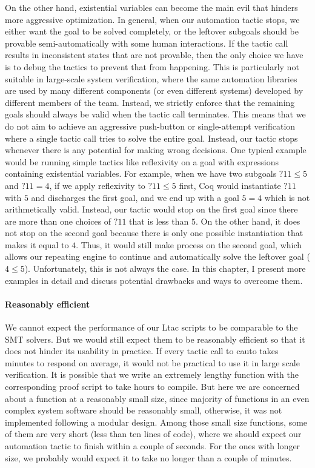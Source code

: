 On the other hand, existential variables can become the main evil that hinders
more aggressive optimization. In general, when our automation tactic stops,
we either want the goal to be solved completely, or the leftover subgoals
should be provable semi-automatically with some human interactions.
If the tactic call results in inconsistent states that are not provable,
then the only choice we have is to debug the tactics to prevent that from
happening. This is particularly not suitable in large-scale system verification,
where the same automation libraries are used by many different components
(or even different systems) developed by different members of the team.
Instead, we strictly enforce that the remaining goals should always be valid
when the tactic call terminates. This means that we do not aim to achieve
an aggressive push-button or single-attempt verification where a single tactic
call tries to solve the entire goal. Instead, our tactic stops whenever
there is any potential for making wrong decisions. One typical example would
be running simple tactics like \textsf{reflexivity} on a goal with expressions
containing existential variables. For example, when we have two subgoals
$?11\le5$ and $?11=4$, if we apply \textsf{reflexivity} to $?11\le5$ first,
Coq would instantiate $?11$ with $5$ and discharges the first goal, and
we end up with a goal $5=4$ which is not arithmetically valid. Instead,
our tactic would stop on the first goal since there are more than one choices
of $?11$ that is less than $5$. On the other hand, it does not stop on the second
goal because there is only one possible instantiation that makes it equal to $4$.
Thus, it would still make process on the second goal, which allows our repeating
engine to continue and automatically solve the leftover goal ($4\le5$).
Unfortunately, this is not always the case. In this chapter, I present
more examples in detail and discuss potential drawbacks and ways to overcome
them.


\paragraph{Reasonably efficient}

We cannot expect the performance of our Ltac scripts to be comparable
to the SMT solvers. But we would still expect them to be
reasonably efficient so that it does not hinder its usability in practice.
If every tactic call to \textsf{cauto} takes minutes to respond on average,
it would not be practical to use it in large scale verification.
It is possible that we write an extremely lengthy function with the
corresponding proof script to take hours to compile. But here we are
concerned about a function at a reasonably small size, since majority
of functions in an even complex system software should be reasonably small,
otherwise, it was not implemented following a modular design.
Among those small size functions, some of them are very short (less than
ten lines of code), where we should expect our automation tactic to
finish within a couple of seconds. For the ones with longer size,
we probably would expect it to take no longer than a couple of minutes.


